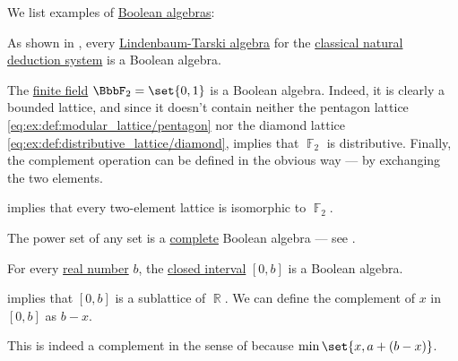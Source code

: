 \begin{example}\label{ex:def:boolean_algebra}
  We list examples of \hyperref[def:boolean_algebra]{Boolean algebras}:

  \begin{thmenum}
     As shown in , every \hyperref[def:lindenbaum_tarski_algebra]{Lindenbaum-Tarski algebra} for the \hyperref[def:propositional_natural_deduction_systems]{classical natural deduction system} is a Boolean algebra.

     The \hyperref[def:finite_field]{finite field} \( \BbbF_2 = \set{ 0, 1 } \) is a Boolean algebra. Indeed, it is clearly a bounded lattice, and since it doesn't contain neither the pentagon lattice \eqref{eq:ex:def:modular_lattice/pentagon} nor the diamond lattice \eqref{eq:ex:def:distributive_lattice/diamond},  implies that \( \BbbF_2 \) is distributive. Finally, the complement operation can be defined in the obvious way --- by exchanging the two elements.

     implies that every two-element lattice is isomorphic to \( \BbbF_2 \).

     The power set of any set is a \hyperref[def:complete_lattice]{complete} Boolean algebra --- see .

     For every \hyperref[def:real_numbers]{real number} \( b \), the \hyperref[def:order_interval/closed]{closed interval} \( [0, b] \) is a Boolean algebra.

     implies that \( [0, b] \) is a sublattice of \( \BbbR \). We can define the complement of \( x \) in \( [0, b] \) as \( b - x \).

    This is indeed a complement in the sense of  because \( \min\set{ x, a + (b - x) } \).
  \end{thmenum}
\end{example}


